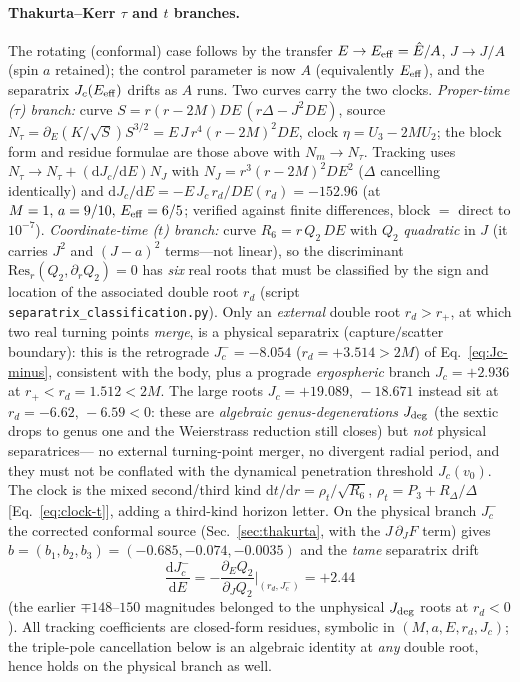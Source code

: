 \documentclass[12pt]{iopart}
\newcommand{\Ehat}{\hat E}
\newcommand{\Jc}{J_{c}}
\newcommand{\dd}{\mathrm{d}}
\begin{document}
\paragraph{Thakurta--Kerr $\tau$ and $t$ branches.}
The rotating (conformal) case follows by the transfer $E\to E_{\rm eff}=\Ehat/A$,
$J\to J/A$ (spin $a$ retained); the control parameter is now $A$ (equivalently $E_{\rm eff}$), and
the separatrix $\Jc(E_{\rm eff})$ drifts as $A$ runs. Two curves carry the two clocks.
\emph{Proper-time ($\tau$) branch:} curve $S=r(r-2M)DE\,(r\Delta-J^2DE)$, source
$N_\tau=\partial_E(K/\sqrt S)S^{3/2}=E\,J\,r^4(r-2M)^2DE$, clock
$\eta=U_3-2MU_2$; the block form and residue formulae are those above with
$N_m\to N_\tau$. Tracking uses $N_\tau\to N_\tau+(\dd\Jc/\dd E)N_J$ with
$N_J=r^3(r-2M)^2DE^2$ ($\Delta$ cancelling identically) and
$\dd\Jc/\dd E=-E\,\Jc\,r_d/DE(r_d)=-152.96$ (at $M=1,\,a=9/10,\,E_{\rm eff}=6/5$;
verified against finite differences, block $=$ direct to $10^{-7}$).
\emph{Coordinate-time ($t$) branch:} curve $R_6=r\,Q_2\,DE$ with $Q_2$
\emph{quadratic} in $J$ (it carries $J^2$ and $(J-a)^2$ terms---not linear), so the
discriminant $\mathrm{Res}_r(Q_2,\partial_r Q_2)=0$ has \emph{six} real roots that
must be classified by the sign and location of the associated double root $r_d$
(script \texttt{separatrix\_classification.py}). Only an \emph{external} double
root $r_d>r_+$, at which two real turning points \emph{merge}, is a physical
separatrix (capture$/$scatter boundary): this is the retrograde $\Jc^-=-8.054$
($r_d=+3.514>2M$) of Eq.~\eqref{eq:Jc-minus}, consistent with the body, plus a
prograde \emph{ergospheric} branch $\Jc=+2.936$ at $r_+<r_d=1.512<2M$. The large
roots $\Jc=+19.089,\,-18.671$ instead sit at $r_d=-6.62,\,-6.59<0$: these are
\emph{algebraic genus-degenerations} $J_{\rm deg}$ (the sextic drops to genus one
and the Weierstrass reduction still closes) but \emph{not} physical separatrices---
no external turning-point merger, no divergent radial period, and they must not be
conflated with the dynamical penetration threshold $J_c(v_0)$. The clock is the
mixed second/third kind $\dd t/\dd r=\rho_t/\sqrt{R_6}$, $\rho_t=P_3+R_\Delta/\Delta$
[Eq.~\eqref{eq:clock-t}], adding a third-kind horizon letter. On the physical branch
$\Jc^-$ the corrected conformal source (Sec.~\ref{sec:thakurta}, with the
$J\,\partial_J F$ term) gives $b=(b_1,b_2,b_3)=(-0.685,-0.074,-0.0035)$ and the
\emph{tame} separatrix drift
\begin{equation}
\frac{\dd\Jc^-}{\dd E}=-\frac{\partial_E Q_2}{\partial_J Q_2}\bigg|_{(r_d,\Jc^-)}=+2.44
\end{equation}
(the earlier $\mp148$--$150$ magnitudes belonged to the unphysical $J_{\rm deg}$
roots at $r_d<0$). All tracking coefficients are closed-form residues, symbolic in
$(M,a,E,r_d,\Jc)$; the triple-pole cancellation below is an algebraic identity at
\emph{any} double root, hence holds on the physical branch as well.
\end{document}
